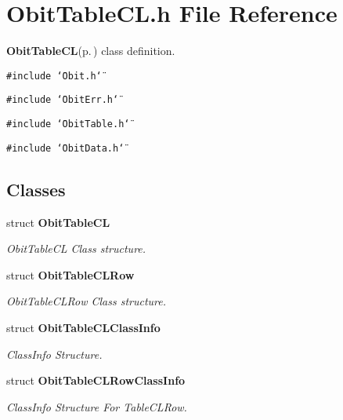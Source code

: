 \section{Obit\-Table\-CL.h File Reference}
\label{ObitTableCL_8h}
{\bf Obit\-Table\-CL}{\rm (p.\,\pageref{structObitTableCL})} class definition. 

{\tt \#include \char`\"{}Obit.h\char`\"{}}\par
{\tt \#include \char`\"{}Obit\-Err.h\char`\"{}}\par
{\tt \#include \char`\"{}Obit\-Table.h\char`\"{}}\par
{\tt \#include \char`\"{}Obit\-Data.h\char`\"{}}\par
\subsection*{Classes}
\begin{CompactItemize}
\item 
struct {\bf Obit\-Table\-CL}
\begin{CompactList}\small\item\em Obit\-Table\-CL Class structure. \item\end{CompactList}\item 
struct {\bf Obit\-Table\-CLRow}
\begin{CompactList}\small\item\em Obit\-Table\-CLRow Class structure. \item\end{CompactList}\item 
struct {\bf Obit\-Table\-CLClass\-Info}
\begin{CompactList}\small\item\em Class\-Info Structure. \item\end{CompactList}\item 
struct {\bf Obit\-Table\-CLRow\-Class\-Info}
\begin{CompactList}\small\item\em Class\-Info Structure For Table\-CLRow. \item\end{CompactList}\end{CompactItemize}
